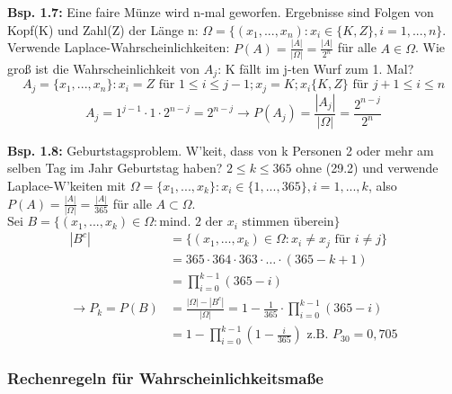 \documentclass[a4paper,11pt]{article}
\begin{document}
\vspace{6pt}
\noindent\textbf{Bsp. 1.7:} Eine faire Münze wird n-mal geworfen. 
Ergebnisse sind Folgen von Kopf(K) und Zahl(Z) der Länge n: $\Omega = \{(x_1,...,x_n): x_i\in\{K,Z\}, i = 1,...,n\}$. 
Verwende Laplace-Wahrscheinlichkeiten: $P(A)=\frac{|A|}{|\Omega|}=\frac{|A|}{2^n}$ für alle $A\in\Omega$.
Wie groß ist die Wahrscheinlichkeit von $A_j$: \glqq K fällt im j-ten Wurf zum 1. Mal\grqq?
\[A_j = \{x_1,...,x_n\}: x_i=Z \text{ für } 1 \leq i \leq j-1; x_j=K; x_i \{K,Z\} \text{ für } j+1 \leq i \leq n\]
\[A_j = 1^{j-1}\cdot 1\cdot 2^{n-j}=2^{n-j} \rightarrow P(A_j) = \frac{|A_j|}{|\Omega|}= \frac{2^{n-j}}{2^{n}}\]

\noindent\textbf{Bsp. 1.8:} Geburtstagsproblem.
W'keit, dass von k Personen 2 oder mehr am selben Tag im Jahr Geburtstag haben?
$2 \leq k \leq 365$ ohne (29.2) und verwende Laplace-W'keiten mit $\Omega=\{x_1,...,x_k\}: x_i \in \{1,...,365\}, i=1,...,k$, also 
$P(A)=\frac{|A|}{|\Omega|}=\frac{|A|}{365}$ für alle $A\subset\Omega$.
$\text{Sei }B=\{(x_1,...,x_k) \in\Omega: \text{mind. 2 der } x_i \text{ stimmen überein}\}$
\begin{align*}
    |B^c| &= \{(x_1, \dots ,x_k) \in \Omega: x_i \neq x_j \text{ für }i \neq j\} \\
    &= 365 \cdot 364 \cdot 363 \cdot\dots\cdot (365-k+1) \\
    &= \prod_{i=0}^{k-1}(365-i) \\
    \rightarrow P_k = P(B) &= \frac{|\Omega| - |B^c|}{|\Omega|} = 1 - \frac{1}{365}\cdot \prod_{i=0}^{k-1}(365-i) \\
    &= 1 - \prod_{i=0}^{k-1}(1-\frac{i}{365}) \text{           z.B. } P_{30} = 0,705
\end{align*}

\subsubsection{Rechenregeln für Wahrscheinlichkeitsmaße}
\end{document}
